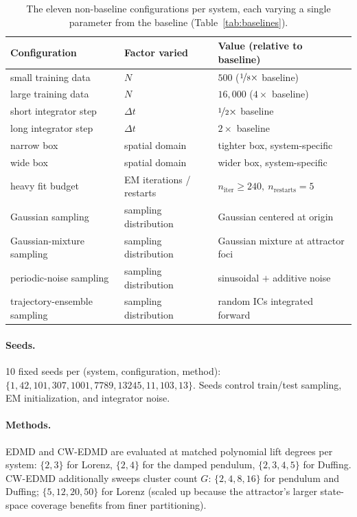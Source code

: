 \documentclass{article}
\begin{document}
\begin{table}[H]
\centering\footnotesize
\caption{The eleven non-baseline configurations per system, each varying a single parameter from the baseline (Table~\ref{tab:baselines}).}
\label{tab:configs}
\begin{tabular}{l l l}
\toprule
Configuration                & Factor varied             & Value (relative to baseline) \\
\midrule
small training data          & $N$                       & $500$ ($\nicefrac{1}{8}{\times}$ baseline) \\
large training data          & $N$                       & $16{,}000$ ($4{\times}$ baseline) \\
short integrator step        & $\Delta t$                & $\nicefrac{1}{2}{\times}$ baseline \\
long integrator step         & $\Delta t$                & $2{\times}$ baseline \\
narrow box                   & spatial domain            & tighter box, system-specific \\
wide box                     & spatial domain            & wider box, system-specific \\
heavy fit budget             & EM iterations / restarts  & $n_{\text{iter}}{\geq}240,\ n_{\text{restarts}}{=}5$ \\
Gaussian sampling            & sampling distribution     & Gaussian centered at origin \\
Gaussian-mixture sampling    & sampling distribution     & Gaussian mixture at attractor foci \\
periodic-noise sampling      & sampling distribution     & sinusoidal $+$ additive noise \\
trajectory-ensemble sampling & sampling distribution     & random ICs integrated forward \\
\bottomrule
\end{tabular}
\end{table}

\paragraph{Seeds.} 10 fixed seeds per (system, configuration, method): $\{1, 42, 101, 307, 1001, 7789, 13245, 11, 103, 13\}$. Seeds control train/test sampling, EM initialization, and integrator noise.

\paragraph{Methods.} EDMD and CW-EDMD are evaluated at matched polynomial lift degrees per system: $\{2,3\}$ for Lorenz, $\{2,4\}$ for the damped pendulum, $\{2,3,4,5\}$ for Duffing. CW-EDMD additionally sweeps cluster count $G$: $\{2,4,8,16\}$ for pendulum and Duffing; $\{5,12,20,50\}$ for Lorenz (scaled up because the attractor's larger state-space coverage benefits from finer partitioning).
\end{document}
